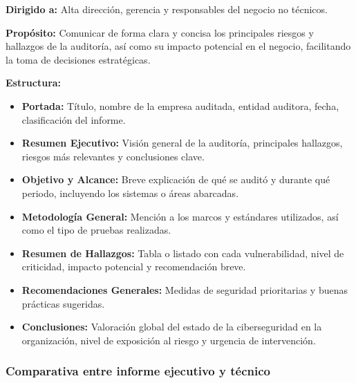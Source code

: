 \documentclass[a4paper, 11pt]{article}
\begin{document}
\textbf{Dirigido a:} Alta dirección, gerencia y responsables del negocio no técnicos.

\textbf{Propósito:} Comunicar de forma clara y concisa los principales riesgos y hallazgos de la auditoría, así como su impacto potencial en el negocio, facilitando la toma de decisiones estratégicas.

\textbf{Estructura:}
\begin{itemize}
  \item \textbf{Portada:} Título, nombre de la empresa auditada, entidad auditora, fecha, clasificación del informe.
  \item \textbf{Resumen Ejecutivo:} Visión general de la auditoría, principales hallazgos, riesgos más relevantes y conclusiones clave.
  \item \textbf{Objetivo y Alcance:} Breve explicación de qué se auditó y durante qué periodo, incluyendo los sistemas o áreas abarcadas.
  \item \textbf{Metodología General:} Mención a los marcos y estándares utilizados, así como el tipo de pruebas realizadas.
  \item \textbf{Resumen de Hallazgos:} Tabla o listado con cada vulnerabilidad, nivel de criticidad, impacto potencial y recomendación breve.
  \item \textbf{Recomendaciones Generales:} Medidas de seguridad prioritarias y buenas prácticas sugeridas.
  \item \textbf{Conclusiones:} Valoración global del estado de la ciberseguridad en la organización, nivel de exposición al riesgo y urgencia de intervención.
\end{itemize}




\subsubsection{Comparativa entre informe ejecutivo y técnico}
\end{document}
